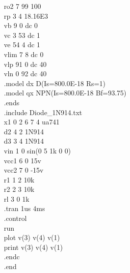 \documentclass[12pt]{article}
\begin{document}
\newpage
ro2   7 99 100\\
rp    3  4 18.16E3\\
vb    9  0 dc 0\\
vc    3 53 dc 1\\
ve   54  4 dc 1\\
vlim  7  8 dc 0\\
vlp  91  0 dc 40\\
vln   0 92 dc 40\\
.model dx D(Is=800.0E-18 Rs=1)\\
.model qx NPN(Is=800.0E-18 Bf=93.75)\\
.ends\\
.include Diode\_1N914.txt\\
x1 0 2  6 7 4 ua741\\
d2 4 2 1N914\\
d3 3 4 1N914\\
vin 1 0 sin(0 5 1k 0 0)\\
vcc1 6 0 15v\\
vcc2 7 0 -15v\\
r1 1 2 10k\\
r2 2 3 10k\\
rl 3 0 1k\\
.tran 1us 4ms\\  
.control\\
run\\
plot v(3) v(4) v(1)\\
print v(3) v(4) v(1)\\
.endc \\
.end\\
\newpage
\end{document}
